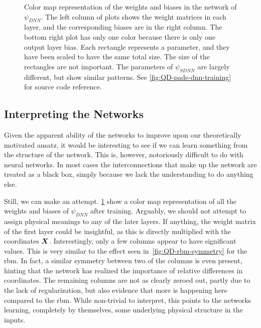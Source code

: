 \documentclass[Thesis.tex]{subfiles}
\begin{document}
\begin{figure}[h]
   \centering
    \resizebox{!}{0.35\paperheight}{%
        
    }
    \caption[Weights of a neural network trained on quantum
dots]{\label{fig:QD-pade-dnn-weights}Color map representation of the weights and
biases in the network of $\psi_{DNN}$. The left column of plots shows the weight
matrices in each layer, and the corresponding biases are in the right column.
The bottom right plot has only one color because there is only one output layer
bias. Each rectangle represents a parameter, and they have been scaled to have
the same total size. The size of the rectangles are not important. The
parameters of $\psi_{SDNN}$ are largely different, but show similar patterns.
See \cref{fig:QD-pade-dnn-training} for source code reference.}
\end{figure}

\subsection{Interpreting the Networks}

Given the apparent ability of the networks to improve upon our theoretically
motivated ansatz, it would be interesting to see if we can learn something from
the structure of the network. This is, however, notoriously difficult to do with
neural networks. In most cases the interconnections that make up the network are
treated as a black box, simply because we lack the understanding to do
anything else.

Still, we can make an attempt. \cref{fig:QD-pade-dnn-weights} show a color map
representation of all the weights and biases of $\psi_{DNN}$ after training.
Arguably, we should not attempt to assign physical meanings to any of the later
layers. If anything, the weight matrix of the first layer could be insightful,
as this is directly multiplied with the coordinates $\bm{X}$. Interestingly,
only a few columns appear to have significant values. This is very similar to the
effect seen in~\cref{fig:QD-rbm-symmetry} for the \gls{rbm}. In fact, a similar
symmetry between two of the columns is even present, hinting that the network
has realized the importance of relative differences in coordinates. The
remaining columns are not as clearly zeroed out, partly due to
the lack of regularization, but also evidence that more is happening here
compared to the \gls{rbm}. While non-trivial to interpret, this points to the
networks learning, completely by themselves, some underlying physical structure
in the inputs.
\end{document}
